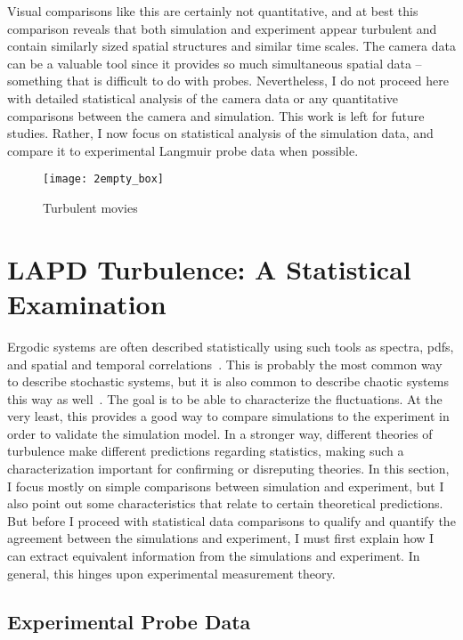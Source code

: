 Visual comparisons like this are certainly not quantitative, and at best this comparison
reveals that both simulation and experiment appear turbulent and contain similarly sized spatial structures and similar time scales. The camera data can be a valuable tool since it provides
so much simultaneous spatial data -- something that is difficult to do with probes. Nevertheless, I do not proceed here with detailed statistical analysis of the camera data or any
quantitative comparisons between the camera and simulation. This work is left for future studies. Rather, I now focus on statistical analysis of the simulation data, and compare it to
experimental Langmuir probe data when possible.


\begin{figure}
\centerline{\texttt{[image: 2empty\_box]}}
\caption{Turbulent movies}
\label{sim_v_exp_anim}
\end{figure}


\section{LAPD Turbulence: A Statistical Examination}
\label{s_stat_exam}

Ergodic systems are often described statistically using such tools as spectra, pdfs, and spatial and temporal correlations~\cite{tennekes1972}. 
This is probably the most common way to describe stochastic systems, but it is also common to describe chaotic systems this way as well~\cite{swinney1981}. 
The goal is to be able to characterize the fluctuations. At the very least, this provides a good way to compare simulations
to the experiment in order to validate the simulation model. In a stronger way, different theories of turbulence make different predictions regarding statistics, making such a characterization
important for confirming or disreputing theories. In this section, I focus mostly on simple comparisons between simulation and experiment, but I also point out some characteristics that relate to
certain theoretical predictions. But before I proceed with statistical data comparisons to qualify and quantify the agreement between the simulations and experiment, 
I must first explain how I can extract
equivalent information from the simulations and experiment. In general, this hinges upon experimental measurement theory.

\subsection{Experimental Probe Data}
\label{ss_probe_data}

